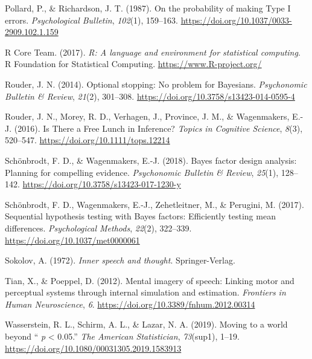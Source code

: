 \documentclass[
  man, donotrepeattitle,floatsintext]{apa6}
\newlength{\cslhangindent}
\newlength{\cslentryspacingunit} %
\newenvironment{CSLReferences}[2] %
 {%
  \setlength{\parindent}{0pt}
  \ifodd #1
  \let\oldpar\par
  \def\par{\hangindent=\cslhangindent\oldpar}
  \fi
  \setlength{\parskip}{#2\cslentryspacingunit}
 }%
 {}
\begin{document}
\begin{CSLReferences}{1}{0}
\leavevmode{}%
Pollard, P., \& Richardson, J. T. (1987). On the probability of making {Type} {I} errors. \emph{Psychological Bulletin}, \emph{102}(1), 159--163. \url{https://doi.org/10.1037/0033-2909.102.1.159}

\leavevmode{}%
R Core Team. (2017). \emph{R: A language and environment for statistical computing}. R Foundation for Statistical Computing. \url{https://www.R-project.org/}

\leavevmode{}%
Rouder, J. N. (2014). Optional stopping: {No} problem for {Bayesians}. \emph{Psychonomic Bulletin \& Review}, \emph{21}(2), 301--308. \url{https://doi.org/10.3758/s13423-014-0595-4}

\leavevmode{}%
Rouder, J. N., Morey, R. D., Verhagen, J., Province, J. M., \& Wagenmakers, E.-J. (2016). Is {There} a {Free} {Lunch} in {Inference}? \emph{Topics in Cognitive Science}, \emph{8}(3), 520--547. \url{https://doi.org/10.1111/tops.12214}

\leavevmode{}%
Schönbrodt, F. D., \& Wagenmakers, E.-J. (2018). Bayes factor design analysis: {Planning} for compelling evidence. \emph{Psychonomic Bulletin \& Review}, \emph{25}(1), 128--142. \url{https://doi.org/10.3758/s13423-017-1230-y}

\leavevmode{}%
Schönbrodt, F. D., Wagenmakers, E.-J., Zehetleitner, M., \& Perugini, M. (2017). Sequential hypothesis testing with {Bayes} factors: {Efficiently} testing mean differences. \emph{Psychological Methods}, \emph{22}(2), 322--339. \url{https://doi.org/10.1037/met0000061}

\leavevmode{}%
Sokolov, A. (1972). \emph{Inner speech and thought}. Springer-Verlag.

\leavevmode{}%
Tian, X., \& Poeppel, D. (2012). Mental imagery of speech: Linking motor and perceptual systems through internal simulation and estimation. \emph{Frontiers in Human Neuroscience}, \emph{6}. \url{https://doi.org/10.3389/fnhum.2012.00314}

\leavevmode{}%
Wasserstein, R. L., Schirm, A. L., \& Lazar, N. A. (2019). Moving to a world beyond {`` \emph{p} {\textless{}} 0.05.''} \emph{The American Statistician}, \emph{73}(sup1), 1--19. \url{https://doi.org/10.1080/00031305.2019.1583913}


\end{CSLReferences}
\end{document}
